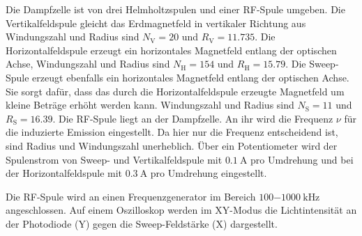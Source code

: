 	Die Dampfzelle ist von drei Helmholtzspulen und einer RF-Spule
	umgeben.
	Die Vertikalfeldspule gleicht das Erdmagnetfeld in
			vertikaler Richtung aus Windungszahl und Radius sind
			$N_\text{V}=20$ und $R_\text{V}=11.735$.
		Die Horizontalfeldspule erzeugt ein horizontales
			Magnetfeld entlang der optischen Achse, Windungszahl und Radius
			sind
			$N_\text{H}= 154$ und $R_\text{H}=15.79$.
		Die Sweep-Spule erzeugt ebenfalls ein horizontales
			Magnetfeld entlang der optischen Achse. Sie sorgt dafür, dass
			das durch die
			Horizontalfeldspule erzeugte Magnetfeld um kleine
			Beträge erhöht werden kann. Windungszahl
			und Radius sind
			$N_\text{S}=11$ und $R_\text{S}=16.39$.
		Die RF-Spule liegt an der Dampfzelle. An ihr
			wird die Frequenz $\nu$ für die induzierte Emission
			eingestellt. Da hier nur die Frequenz entscheidend ist,
			sind Radius und Windungszahl unerheblich.
	Über ein Potentiometer wird der Spulenstrom von Sweep- und
	Vertikalfeldspule mit $\SI{0.1}{\ampere}$ pro Umdrehung und bei
	der Horizontalfeldspule mit $\SI{0.3}{\ampere}$ pro Umdrehung
	eingestellt.

	Die RF-Spule wird an einen Frequenzgenerator im Bereich
	$\SI{100-1000}{\kilo\hertz}$ angeschlossen. Auf einem Oszilloskop
	werden im XY-Modus die Lichtintensität an der Photodiode (Y) gegen
	die Sweep-Feldstärke (X) dargestellt.
